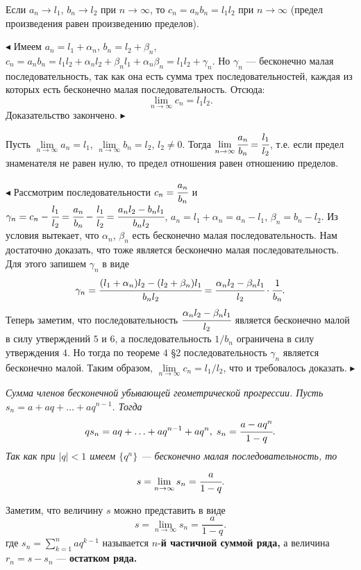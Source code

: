 \begin{approval}Если $a_n\to l_1$, $b_n\to l_2$ при $n\to\infty$, то 
$c_n=a_nb_n=l_1l_2$ при $n\to\infty$ (предел произведения равен 
произведению пределов).
\end{approval}
$\blacktriangleleft$
Имеем $a_n=l_1+\alpha_n$, $b_n=l_2+\beta_n$, $c_n=a_nb_n=l_1l_2+\alpha_n l_2+
\beta_n l_1+\alpha_n\beta_n=l_1l_2+\gamma_n$. Но $\gamma_n$ --- бесконечно
 малая последовательность, так как она есть сумма трех последовательностей,
 каждая из которых есть бесконечно малая последовательность. Отсюда:
 $$
 \lim_{n\to\infty}c_n=l_1l_2.
 $$
 Доказательство закончено.
$\blacktriangleright$

\begin{approval}Пусть $\lim\limits_{n\to\infty}a_n=l_1$, $\lim\limits_{n\to\infty}
b_n=l_2$, $l_2\ne0$. Тогда $\lim\limits_{n\to\infty}\cfrac{a_n}{b_n}=
\cfrac{l_1}{l_2}$, т.е. если предел знаменателя не равен нулю, то предел
отношения равен отношению пределов.
\end{approval}
$\blacktriangleleft$
Рассмотрим последовательности $c_n=\cfrac{a_n}{b_n}$ и $\gamma_n=
c_n-\cfrac{l_1}{l_2}=\cfrac{a_n}{b_n}-\cfrac{l_1}{l_2}=\cfrac{a_nl_2-b_n
l_1}{b_nl_2}$, $a_n=l_1+\alpha_n=a_n-l_1$, $\beta_n=b_n-l_2$.
Из условия вытекает, что $\alpha_n$, $\beta_n$ есть бесконечно малая 
последовательность. Нам достаточно доказать, что тоже является бесконечно
малая последовательность. Для этого запишем $\gamma_n$ в виде
$$
\gamma_n=\cfrac{(l_1+\alpha_n)l_2-(l_2+\beta_n)l_1}{b_nl_2}=
\cfrac{\alpha_nl_2-\beta_nl_1}{l_2}\cdot\cfrac{1}{b_n}.
$$
Теперь заметим, что последовательность $\cfrac{\alpha_nl_2-\beta_nl_1}{l_2}$
является бесконечно малой в силу утверждений $5$ и $6$, а 
последовательность $1/b_n$ ограничена в силу утверждения $4$. Но тогда по
теореме $4$ \S2 последовательность $\gamma_n$ является бесконечно малой.
Таким образом, $\lim\limits_{n\to\infty}c_n=l_1/l_2$, что и требовалось
доказать.
$\blacktriangleright$

\vskip 3mm
\begin{example} \itshape Сумма членов бесконечной убывающей 
геометрической прогрессии. \linebreak[4] Пусть $s_n=a+aq+\ldots+aq^{n-1}$. Тогда
$$
qs_n=aq+\ldots+aq^{n-1}+aq^n,\;s_n=\cfrac{a-aq^n}{1-q}.
$$
Так как при $|q|<1$ имеем $\{q^n\}$ --- бесконечно малая последовательность, то
$$
s=\lim_{n\to\infty}s_n=\cfrac{a}{1-q}.
$$

Заметим, что величину $s$ можно представить в виде
$$
s=\lim_{n\to\infty}s_n=\frac{a}{1-q}.
$$
где $s_n=\sum_{k=1}^naq^{k-1}$ называется $n$-{\bfseries й частичной 
суммой ряда,} а величина $r_n=s-s_n$ --- {\bfseries остатком ряда.}
\end{example}
